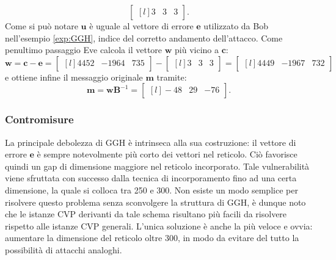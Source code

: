 \begin{exmp}
\begin{equation*}
\begin{bmatrix*}[l]
        3 & 3 & 3
    \end{bmatrix*}.
\end{equation*}
Come si può notare $\mathbf{u}$ è uguale al vettore di errore $\mathbf{e}$ utilizzato da Bob nell'esempio
\ref{exp:GGH}, indice del corretto andamento dell'attacco. 
Come penultimo passaggio Eve calcola il vettore $\mathbf{w}$ più vicino a $\mathbf{c}$:
\begin{equation*}
    \mathbf{w} = \mathbf{c} - \mathbf{e} =
    \begin{bmatrix*}[l]
        4452 & -1964 & 735
    \end{bmatrix*} -
    \begin{bmatrix*}[l]
        3 & 3 & 3
    \end{bmatrix*} =
    \begin{bmatrix*}[l]
        4449 & -1967 & 732
    \end{bmatrix*}
\end{equation*}
e ottiene infine il messaggio originale $\mathbf{m}$ tramite:
\begin{equation*}
    \mathbf{m} = \mathbf{w}\mathbf{B}^{-1} =
    \begin{bmatrix*}[l]
        -48 & 29 & -76
    \end{bmatrix*}.
\end{equation*}
\end{exmp}

\subsubsection{Contromisure}
La principale debolezza di GGH è intrinseca alla sua costruzione: il vettore di errore
$\mathbf{e}$ è sempre notevolmente più corto dei vettori nel reticolo. Ciò favorisce quindi
un gap di dimensione maggiore nel reticolo incorporato. Tale vulnerabilità viene sfruttata
con successo dalla tecnica di incorporamento fino ad una certa dimensione, la quale si 
colloca tra 250 e 300. Non esiste un modo semplice per risolvere questo problema senza 
sconvolgere la struttura di GGH, è dunque noto che le istanze CVP derivanti da tale schema
risultano più facili da risolvere rispetto alle istanze CVP generali. L'unica soluzione 
è anche la più veloce e ovvia: aumentare la dimensione del reticolo oltre 300, in modo da
evitare del tutto la possibilità di attacchi analoghi. 

